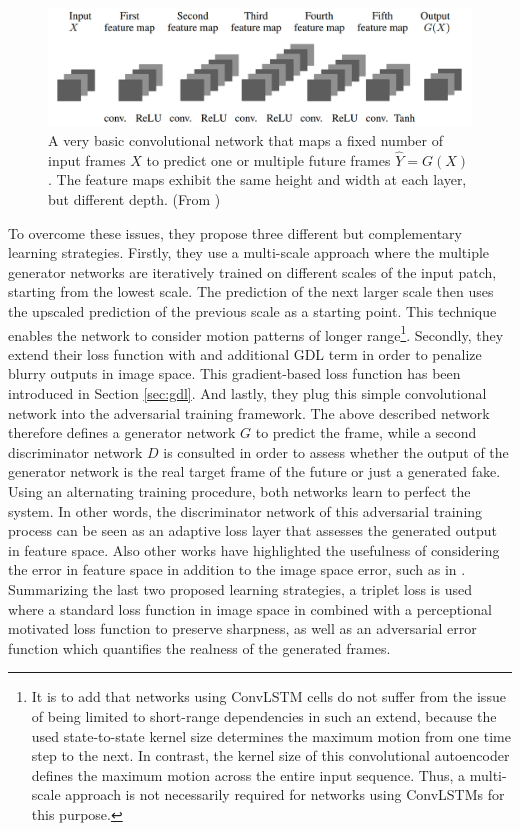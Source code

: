 \begin{figure}[htb]
	\centering
	\includegraphics[width=0.8\linewidth]{figures/related/deep_multiscale_generator.png} 
	\caption[Convolutional Autoencoder for Future Generation]{A very basic convolutional network that maps a fixed number of input frames $X$ to predict one or multiple future frames $\hat{Y} = G(X)$. The feature maps exhibit the same height and width at each layer, but different depth. (From \parencite{deep_multiscale_video_pred})} \label{fig:gan_generator}
\end{figure}

To overcome these issues, they propose three different but complementary learning strategies. Firstly, they use a multi-scale approach where the multiple generator networks are iteratively trained on different scales of the input patch, starting from the lowest scale. The prediction of the next larger scale then uses the upscaled prediction of the previous scale as a starting point. This technique enables the network to consider motion patterns of longer range\footnote{It is to add that networks using ConvLSTM cells do not suffer from the issue of being limited to short-range dependencies in such an extend, because the used state-to-state kernel size determines the maximum motion from one time step to the next. In contrast, the kernel size of this convolutional autoencoder defines the maximum motion across the entire input sequence. Thus, a multi-scale approach is not necessarily required for networks using ConvLSTMs for this purpose.}. Secondly, they extend their loss function with and additional GDL term in order to penalize blurry outputs in image space. This gradient-based loss function has been introduced in Section \ref{sec:gdl}. And lastly, they plug this simple convolutional network into the adversarial training framework. The above described network therefore defines a generator network $G$ to predict the frame, while a second discriminator network $D$ is consulted in order to assess whether the output of the generator network is the real target frame of the future or just a generated fake. Using an alternating training procedure, both networks learn to perfect the system. In other words, the discriminator network of this adversarial training process can be seen as an adaptive loss layer that assesses the generated output in feature space. Also other works have highlighted the usefulness of considering the error in feature space in addition to the image space error, such as in \parencite{gen_img_perc_sim}. Summarizing the last two proposed learning strategies, a triplet loss is used where a standard loss function in image space in combined with a perceptional motivated loss function to preserve sharpness, as well as an adversarial error function which quantifies the realness of the generated frames. 

